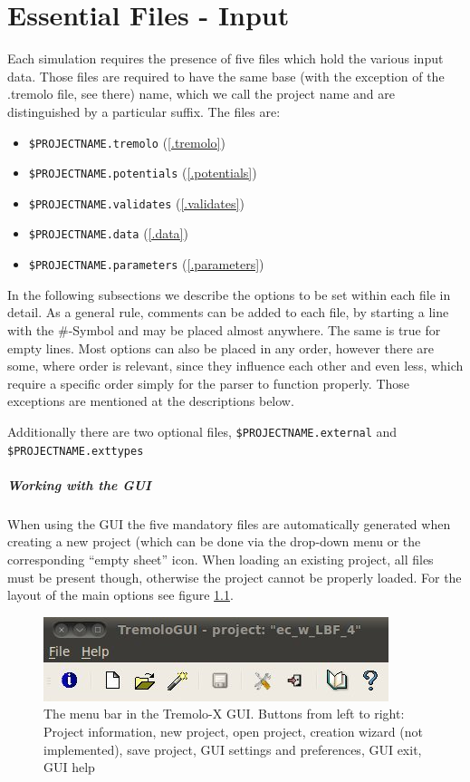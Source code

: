 \chapter{Essential Files - Input}
Each simulation requires the presence of five files which hold the various input data. Those files are required to have the same base (with the exception of the .tremolo file, see there) name, which we call the project name and are distinguished by a particular suffix. The files are:
\begin{itemize}
 \item \texttt{\$PROJECTNAME.tremolo} (\ref{.tremolo})
\item \texttt{\$PROJECTNAME.potentials} (\ref{.potentials})
\item \texttt{\$PROJECTNAME.validates} (\ref{.validates})
\item \texttt{\$PROJECTNAME.data} (\ref{.data})
\item \texttt{\$PROJECTNAME.parameters} (\ref{.parameters})
\end{itemize}
In the following subsections we describe the options to be set within each file in detail. As a general rule, comments can be added to each file, by starting a line with the \#-Symbol and may be placed almost anywhere. The same is true for empty lines. Most options can also be placed in any order, however there are some, where order is relevant, since they influence each other and even less, which require a specific order simply for the parser to function properly. Those exceptions are mentioned at the descriptions below.

Additionally there are two optional files, \texttt{\$PROJECTNAME.external} and \texttt{\$PROJECTNAME.exttypes}

\paragraph{Working with the GUI\\}
When using the GUI the five mandatory files are automatically generated when creating a new project (which can be done via the drop-down menu or the corresponding ``empty sheet'' icon.
When loading an existing project, all files must be present though, otherwise the project cannot be properly loaded. For the layout of the main options see figure \ref{GUIoptions}.
\begin{figure}
\centering
\includegraphics{visuals/GUI_Options.jpg}
\caption{The menu bar in the Tremolo-X GUI. Buttons from left to right:
Project information, new project, open project, creation wizard (not implemented), save project, GUI settings and preferences, GUI exit, GUI help}
\label{GUIoptions}
\end{figure}


